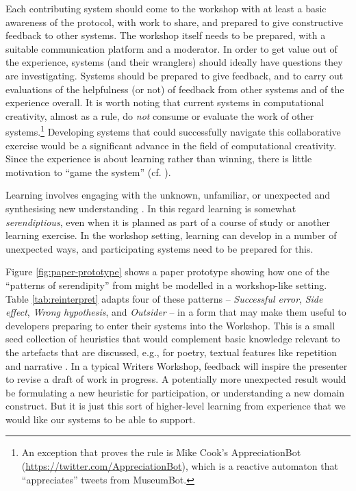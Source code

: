 Each contributing system should come to the workshop with at least a
basic awareness of the protocol, with work to share, and prepared to
give constructive feedback to other systems.  The workshop itself
needs to be prepared, with a suitable communication platform and a
moderator.  In order to get value out of the experience, systems (and
their wranglers) should ideally have questions they are investigating.
Systems should be prepared to give feedback, and to carry out
evaluations of the helpfulness (or not) of feedback from other systems
and of the experience overall.  It is worth noting that current
systems in computational creativity, almost as a rule, do \emph{not}
consume or evaluate the work of other systems.\footnote{An exception
  that proves the rule is Mike Cook's {\sf AppreciationBot}
  (\url{https://twitter.com/AppreciationBot}), which is a reactive
  automaton that ``appreciates'' tweets from {\sf MuseumBot}.}
Developing systems that could successfully navigate this collaborative
exercise would be a significant advance in the field of computational
creativity.  Since the experience is about learning rather than
winning, there is little motivation to ``game the system''
(cf. ).

Learning involves engaging with the unknown, unfamiliar, or unexpected
and synthesising new understanding \cite{deleuze1994difference}.  In
this regard learning is somewhat \emph{serendiptious}, even when it is
planned as part of a course of study or another learning exercise.  In the
workshop setting, learning can develop in a number of unexpected
ways, and participating systems need to be prepared for this.

Figure \ref{fig:paper-prototype} shows a paper prototype showing how
one of the ``patterns of serendipity'' from  might be
modelled in a workshop-like setting.  Table \ref{tab:reinterpret}
adapts four of these patterns -- \emph{Successful error}, \emph{Side
  effect}, \emph{Wrong hypothesis}, and \emph{Outsider} -- in a form
that may make them useful to developers preparing to enter their
systems into the Workshop.  This is a small seed collection of
heuristics that would complement basic knowledge relevant to the
artefacts that are discussed, e.g., for poetry, textual features like
repetition and narrative \cite{corneli15iccc}.  In a typical Writers
Workshop, feedback will inspire the presenter to revise a draft of
work in progress.  A potentially more unexpected result would be
formulating a new heuristic for participation, or understanding a new
domain construct.  But it is just this sort of higher-level learning
from experience that we would like our systems to be able to support.



